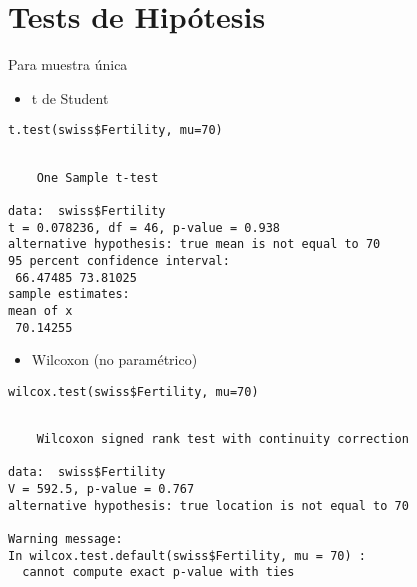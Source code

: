 \documentclass[xcolor={usenames,svgnames,dvipsnames}]{beamer}
\begin{document}
\section{Tests de Hipótesis}
\label{sec:org4629844}
\begin{frame}[fragile,label={sec:org7a9217a}]{Para muestra única}
 \begin{itemize}
\item t de Student
\end{itemize}
\lstset{language=r,label= ,caption= ,captionpos=b,numbers=none}
\begin{lstlisting}
t.test(swiss$Fertility, mu=70)
\end{lstlisting}

\begin{verbatim}

	One Sample t-test

data:  swiss$Fertility
t = 0.078236, df = 46, p-value = 0.938
alternative hypothesis: true mean is not equal to 70
95 percent confidence interval:
 66.47485 73.81025
sample estimates:
mean of x 
 70.14255
\end{verbatim}

\begin{itemize}
\item Wilcoxon (no paramétrico)
\end{itemize}
\lstset{language=r,label= ,caption= ,captionpos=b,numbers=none}
\begin{lstlisting}
wilcox.test(swiss$Fertility, mu=70)
\end{lstlisting}

\begin{verbatim}

	Wilcoxon signed rank test with continuity correction

data:  swiss$Fertility
V = 592.5, p-value = 0.767
alternative hypothesis: true location is not equal to 70

Warning message:
In wilcox.test.default(swiss$Fertility, mu = 70) :
  cannot compute exact p-value with ties
\end{verbatim}
\end{frame}
\end{document}
